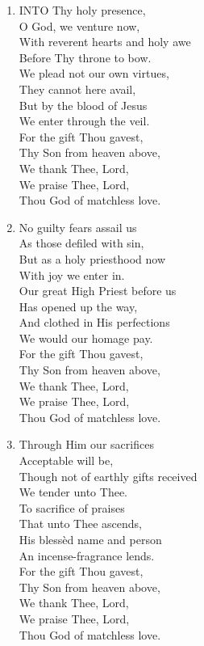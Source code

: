 \begin{enumerate}
    \item INTO Thy holy presence, \\
        O God, we venture now, \\
        With reverent hearts and holy awe \\
        Before Thy throne to bow. \\
        We plead not our own virtues, \\
        They cannot here avail, \\
        But by the blood of Jesus \\
        We enter through the veil. \\
        For the gift Thou gavest, \\
        Thy Son from heaven above, \\
        We thank Thee, Lord, \\
        We praise Thee, Lord, \\
        Thou God of matchless love.

    \item No guilty fears assail us \\
        As those defiled with sin, \\
        But as a holy priesthood now \\
        With joy we enter in. \\
        Our great High Priest before us \\
        Has opened up the way, \\
        And clothed in His perfections \\
        We would our homage pay. \\
        For the gift Thou gavest, \\
        Thy Son from heaven above, \\
        We thank Thee, Lord, \\
        We praise Thee, Lord, \\
        Thou God of matchless love.

    \item Through Him our sacrifices \\
        Acceptable will be, \\
        Though not of earthly gifts received \\
        We tender unto Thee. \\
        To sacrifice of praises \\
        That unto Thee ascends, \\
        His bless\`ed name and person \\
        An incense-fragrance lends. \\
        For the gift Thou gavest, \\
        Thy Son from heaven above, \\
        We thank Thee, Lord, \\
        We praise Thee, Lord, \\
        Thou God of matchless love.


\end{enumerate}
